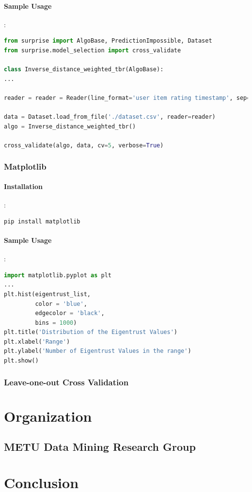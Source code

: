 \documentclass[12pt]{article}
\begin{document}
\paragraph{Sample Usage}:
\begin{lstlisting}[language=python, caption=Surprise example]
from surprise import AlgoBase, PredictionImpossible, Dataset
from surprise.model_selection import cross_validate

class Inverse_distance_weighted_tbr(AlgoBase):
...

reader = reader = Reader(line_format='user item rating timestamp', sep=';', rating_scale=(1, 5))

data = Dataset.load_from_file('./dataset.csv', reader=reader)
algo = Inverse_distance_weighted_tbr()

cross_validate(algo, data, cv=5, verbose=True)
\end{lstlisting}

\subsubsection{Matplotlib}
\paragraph{Installation}:
\begin{lstlisting}[language=bash]
pip install matplotlib
\end{lstlisting}

\paragraph{Sample Usage}:
\begin{lstlisting}[language=python, caption=Matplotlib example]
import matplotlib.pyplot as plt
...
plt.hist(eigentrust_list, 
		 color = 'blue', 
		 edgecolor = 'black',
		 bins = 1000)
plt.title('Distribution of the Eigentrust Values')
plt.xlabel('Range')
plt.ylabel('Number of Eigentrust Values in the range')
plt.show() 
\end{lstlisting}

\subsubsection{Leave-one-out Cross Validation}

\section{Organization}
\subsection{METU Data Mining Research Group}

\section{Conclusion}



\end{document}
